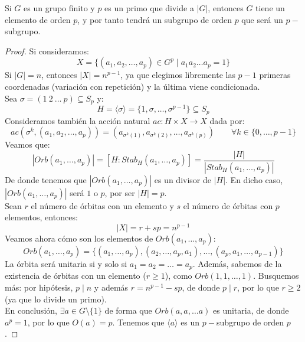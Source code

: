 \begin{teo}[de Cauchy]
    Si $G$ es un grupo finito y $p$ es un primo que divide a $|G|$, entonces $G$ tiene un elemento de orden $p$, y por tanto tendrá un subgrupo de orden $p$ que será un $p-$subgrupo.
    \begin{proof}
        Si consideramos:
        \begin{equation*}
            X = \{(a_1, a_2, \ldots, a_p) \in G^p \mid a_1 a_2 \ldots a_p = 1\}
        \end{equation*}
        Si $|G| = n$, entonces $|X| = n^{p-1}$, ya que elegimos libremente las $p-1$ primeras coordenadas (variación con repetición) y la última viene condicionada.\\

        Sea $\sigma = (1\ 2\ \ldots\ p)  \subseteq S_p$ y:
        \begin{equation*}
            H = \langle \sigma \rangle  = \{1, \sigma, \ldots, \sigma^{p-1}\} \subseteq S_p
        \end{equation*}
        Consideramos también la acción natural $ac:H\times X \to X$ dada por:
        \begin{equation*}
            ac(\sigma^k, (a_1,a_2,\ldots,a_p)) = \left(a_{\sigma^k(1)}, a_{\sigma^k(2)}, \ldots, a_{\sigma^k(p)}\right) \qquad \forall k \in \{0,\ldots,p-1\}
        \end{equation*}
        Veamos que:
        \begin{equation*}
            |Orb(a_1, \ldots, a_p)| = [H:Stab_H(a_1,\ldots,a_p)] = \dfrac{|H|}{|Stab_H(a_1,\ldots,a_p)|}
        \end{equation*}
        De donde tenemos que $|Orb(a_1,\ldots,a_p)|$ es un divisor de $|H|$. En dicho caso, $|Orb(a_1,\ldots,a_p)|$ será $1$ o $p$, por ser $|H| = p$.\\

        \noindent
        Sean $r$ el número de órbitas con un elemento y $s$ el número de órbitas con $p$ elementos, entonces:
        \begin{equation*}
            |X| = r+sp = n^{p-1}
        \end{equation*}
        Veamos ahora cómo son los elementos de $Orb(a_1,\ldots,a_p)$:
        \begin{equation*}
            Orb(a_1,\ldots,a_p) = \{(a_1,\ldots,a_p), (a_2, \ldots, a_p, a_1), \ldots, (a_p, a_1, \ldots, a_{p-1})\}
        \end{equation*}
        La órbita será unitaria si y solo si $a_1 = a_2 = \ldots = a_p$. Además, sabemos de la existencia de órbitas con un elemento ($r\geq 1$), como $Orb(1,1,\ldots,1)$. Busquemos más: por hipótesis, $p \mid n$ y además $r = n^{p-1}-sp $, de donde $p\mid r$, por lo que $r\geq 2$ (ya que lo divide un primo).\\

        \noindent
        En conclusión, $\exists a\in G\setminus \{1\}$ de forma que $Orb(a,a,\ldots a)$ es unitaria, de donde $a^p = 1$, por lo que $O(a) = p$. Tenemos que $\langle a \rangle $ es un $p-$subgrupo de orden $p$.
    \end{proof}
\end{teo}


